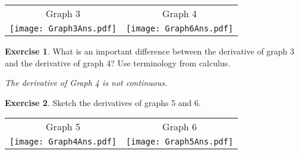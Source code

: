 \documentclass[11pt,fleqn]{article}
\theoremstyle{definition}
\newtheorem{exercise}{Exercise}
\begin{document}
\begin{tabular}{c  c}
Graph 3 & Graph 4 \\
\texttt{[image: Graph3Ans.pdf]} &\texttt{[image: Graph6Ans.pdf]}\\
\end{tabular}

\begin{exercise}  What is an important difference between the derivative of graph 3 and the derivative of graph 4? Use terminology from calculus.\end{exercise}

\emph{The derivative of Graph 4 is not continuous.}


%
\begin{exercise} Sketch the derivatives of graphs 5 and 6.\end{exercise}

\begin{tabular}{c  c}
Graph 5 & Graph 6 \\
\texttt{[image: Graph4Ans.pdf]} &\texttt{[image: Graph5Ans.pdf]}\\
\end{tabular}

 
\end{document}
